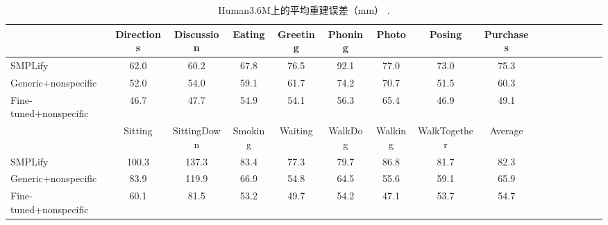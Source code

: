 \begin{table}
  \footnotesize
\caption{Human3.6M上的平均重建误差（mm） \cite{ionescu2014human}.}
\centering
\renewcommand{\arraystretch}{0.5}
\renewcommand{\tabcolsep}{0.1 mm}
\begin{tabular}{l*{15}{c}}
\toprule
 & Directions & Discussion & Eating & Greeting & Phoning & Photo & Posing & Purchases \\
\toprule
SMPLify \cite{bogo2016keep} & 62.0 & 60.2 & 67.8 & 76.5 & 92.1 & 77.0 & 73.0 & 75.3 \\
Generic+nonspecific & 52.0 &         54.0 &         59.1 &         61.7 &         74.2 &         70.7 &         51.5 &         60.3 \\
Fine-tuned+nonspecific & 46.7 &         47.7 &         54.9 &         54.1 &         56.3 &         65.4 &         46.9 &         49.1 \\
\toprule
 & Sitting & SittingDown & Smoking & Waiting & WalkDog & Walking & WalkTogether & Average \\
\toprule
SMPLify \cite{bogo2016keep} & 100.3 & 137.3 & 83.4 & 77.3 & 79.7 & 86.8 & 81.7 & 82.3 \\
Generic+nonspecific & 83.9 &        119.9 &         66.9 &         54.8 &         64.5 &         55.6 &         59.1 &         65.9 \\
Fine-tuned+nonspecific & 60.1 &         81.5 &         53.2 &         49.7 &         54.2 &         47.1 &         53.7 &         54.7 \\
\toprule
\end{tabular}
\label{tab:h36m1}
\end{table}

